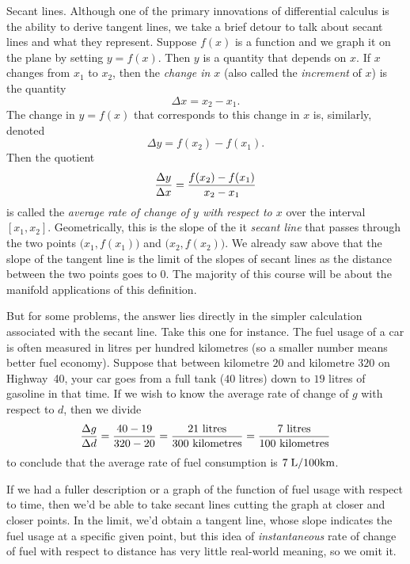 \medskip\boldlabel {} Secant lines.
Although one of the primary innovations of differential calculus is the ability to derive tangent lines,
we take a brief detour to talk about secant lines and what they represent.
Suppose $f(x)$ is a function and we graph it on the plane by setting $y=f(x)$. Then $y$ is a quantity that
depends on $x$. If $x$ changes from $x_1$ to $x_2$, then the {\it change in $x$} (also called the
{\it increment} of $x$) is the quantity
$$\Delta x = x_2 - x_1.$$
The change in $y=f(x)$ that corresponds to this change in $x$ is, similarly, denoted
$$\Delta y = f(x_2) - f(x_1).$$
Then the quotient
$${\Delta y\over \Delta x} = {f(x_2) - f(x_1) \over x_2 - x_1}$$
is called the {\it average rate of change of $y$ with respect to $x$} over the interval $[x_1,x_2]$.
Geometrically, this is the slope of the it {\it secant line} that passes through the two points
$\bigl(x_1, f(x_1)\bigr)$ and $\bigl(x_2, f(x_2)\bigr)$.
We already saw above that the slope of the tangent line is the limit of the slopes of secant lines as
the distance between the two points goes to $0$. The majority of this course will be about the manifold
applications of this definition.

But for some problems, the answer lies directly in the simpler calculation associated with the secant line.
Take this one for instance. The fuel usage of a car is often measured in litres per hundred kilometres
(so a smaller number means better fuel economy).
Suppose that between kilometre $20$ and kilometre $320$ on Highway~40, your car goes from a full tank
($40$ litres) down to $19$ litres of gasoline in that time.
If we wish to know the average
rate of change of $g$ with respect to $d$, then we divide
$${\Delta g\over \Delta d} = {40-19\over 320-20} = {21\ \hbox{litres}\over 300\ \hbox{kilometres}}
= {7\ \hbox{litres}\over 100\ \hbox{kilometres}}$$
to conclude that the average rate of fuel consumption is $7\;\hbox{L/100km}$.

If we had a fuller description or a graph of the function of fuel usage with respect to time, then we'd
be able to take secant lines cutting the graph at closer and closer points. In the limit, we'd obtain
a tangent line, whose slope indicates the fuel usage at a specific given point, but this idea of
{\it instantaneous} rate of change of fuel with respect to distance has very little real-world meaning, so we
omit it.

